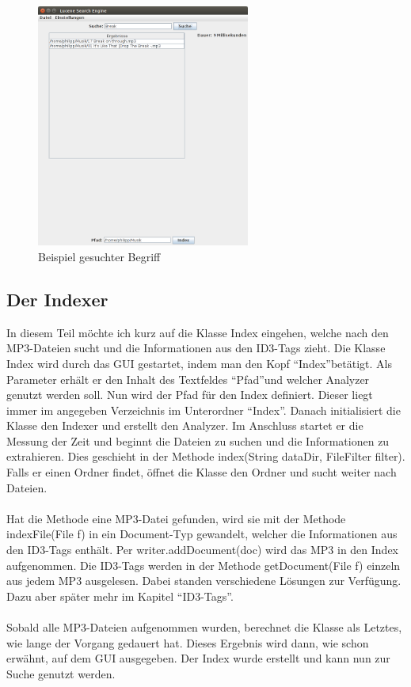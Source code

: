 \documentclass[12pt,a4paper,ngerman]{report}
\begin{document}
\begin{figure}[h!]
\centering
\includegraphics[width=7cm]{img/Lucene_Search_Engine_2.png}
\caption{Beispiel gesuchter Begriff\protect\footnotemark}
\end{figure}
\subsection{Der Indexer}
In diesem Teil möchte ich kurz auf die Klasse Index eingehen, welche nach den MP3-Dateien sucht und die Informationen aus den ID3-Tags zieht. Die Klasse Index wird durch das GUI gestartet, indem man den Kopf \textquotedblleft Index\textquotedblright betätigt. Als Parameter erhält er den Inhalt des Textfeldes \textquotedblleft Pfad\textquotedblright und welcher Analyzer genutzt werden soll. Nun wird der Pfad für den Index definiert. Dieser liegt immer im angegeben Verzeichnis im Unterordner \textquotedblleft Index\textquotedblright . Danach initialisiert die Klasse den Indexer und erstellt den Analyzer. Im Anschluss startet er die Messung der Zeit und beginnt die Dateien zu suchen und die Informationen zu extrahieren. Dies geschieht in der Methode index(String dataDir, FileFilter filter). Falls er einen Ordner findet, öffnet die Klasse den Ordner und sucht weiter nach Dateien.\\
\\
Hat die Methode eine MP3-Datei gefunden, wird sie mit der Methode indexFile(File f) in ein Document-Typ gewandelt, welcher die Informationen aus den ID3-Tags enthält. Per writer.addDocument(doc) wird das MP3 in den Index aufgenommen. Die ID3-Tags werden in der Methode getDocument(File f) einzeln aus jedem MP3 ausgelesen. Dabei standen verschiedene Lösungen zur Verfügung. Dazu aber später mehr im Kapitel \textquotedblleft ID3-Tags\textquotedblright .\\
\\
Sobald alle MP3-Dateien aufgenommen wurden, berechnet die Klasse als Letztes, wie lange der Vorgang gedauert hat. Dieses Ergebnis wird dann, wie schon erwähnt, auf dem GUI ausgegeben. Der Index wurde erstellt und kann nun zur Suche genutzt werden.
\end{document}
